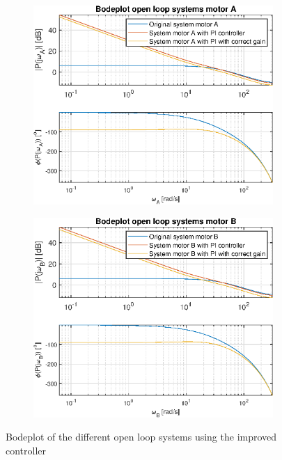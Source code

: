 \documentclass[a4paper,kul]{kulakarticle} %
\begin{document}
\begin{figure}[htp!]
	\centering
	\begin{subfigure}[b]{0.49\textwidth}
		\centering
		\includegraphics[width=\linewidth]{bodeplotA_openloop_method2.eps}
		
	\end{subfigure}
	\hfill
	\begin{subfigure}[b]{0.49\textwidth}  
		\centering
		\includegraphics[width=\linewidth]{bodeplotB_openloop_method2.eps}
		
	\end{subfigure}
	\caption{Bodeplot of the different open loop systems using the improved controller}
	\label{fig:bodeplotopenloopmethod2multiple}
\end{figure}
\end{document}
